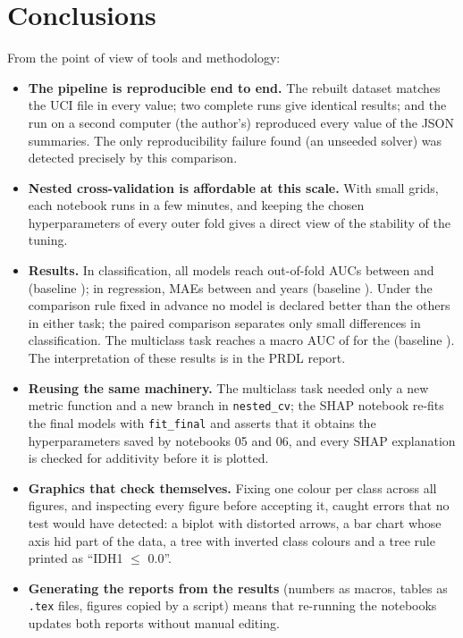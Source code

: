 \section{Conclusions}

From the point of view of tools and methodology:
\begin{itemize}
  \item \textbf{The pipeline is reproducible end to end.} The rebuilt dataset matches the UCI file in
        every value; two complete runs give identical results; and the run on a second computer (the
        author's) reproduced every value of the JSON summaries. The only reproducibility failure
        found (an unseeded solver) was detected precisely by this comparison.
  \item \textbf{Nested cross-validation is affordable at this scale.} With small grids, each notebook
        runs in a few minutes, and keeping the chosen hyperparameters of every outer fold gives a direct
        view of the stability of the tuning.
  \item \textbf{Results.} In classification, all models reach out-of-fold AUCs between \ClfMinAUC{} and
        \ClfMaxAUC{} (baseline \ClfAUCBase); in regression, MAEs between \RegMinMAE{} and \RegMaxMAE{}
        years (baseline \RegBaseMAE). Under the comparison rule fixed in advance no model is declared
        better than the others in either task; the paired comparison separates only small differences
        in classification. The multiclass task reaches a macro AUC of \McBestAUC{} for the \McBest{}
        (baseline \McBaseAUC). The interpretation of these results is in the PRDL report.
  \item \textbf{Reusing the same machinery.} The multiclass task needed only a new metric function and
        a new branch in \texttt{nested\_cv}; the SHAP notebook re-fits the final models with
        \texttt{fit\_final} and asserts that it obtains the hyperparameters saved by notebooks 05 and 06,
        and every SHAP explanation is checked for additivity before it is plotted.
  \item \textbf{Graphics that check themselves.} Fixing one colour per class across all figures, and
        inspecting every figure before accepting it, caught errors that no test would have detected: a
        biplot with distorted arrows, a bar chart whose axis hid part of the data, a tree with inverted
        class colours and a tree rule printed as ``IDH1 $\leq$ 0.0''.
  \item \textbf{Generating the reports from the results} (numbers as macros, tables as \texttt{.tex}
        files, figures copied by a script) means that re-running the notebooks updates both reports
        without manual editing.
\end{itemize}

